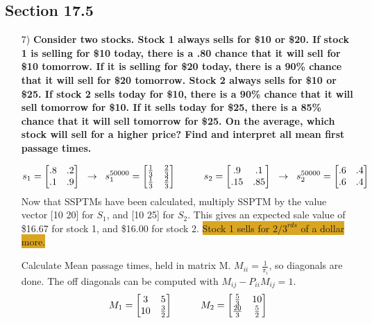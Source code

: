 \documentclass{article}
\begin{document}
\subsection*{Section 17.5}
\begin{enumerate}
\item[7) ] \textbf{Consider two stocks. Stock 1 always sells for \$10 or \$20. If stock 1 is selling for \$10 today, there is a .80 chance that it will sell for \$10 tomorrow. If it is selling for \$20 today, there is a 90\% chance that it will sell for \$20 tomorrow. Stock 2 always sells for \$10 or \$25. If stock 2 sells today for \$10, there is a 90\% chance that it will sell tomorrow for
\$10. If it sells today for \$25, there is a 85\% chance that it will sell tomorrow for \$25. On the average, which stock will sell for a higher price? Find and interpret all mean first passage times.}

\[
s_1 = 
\begin{bmatrix}
.8 & .2\\
.1 & .9 
\end{bmatrix}\hspace*{2mm}\rightarrow\hspace*{2mm}
s_1^{50000} = 
\begin{bmatrix}
\frac{1}{3} & \frac{2}{3}\\
\frac{1}{3} & \frac{2}{3} 
\end{bmatrix}\hspace*{1cm}
s_2 = 
\begin{bmatrix}
.9 & .1\\
.15 & .85 
\end{bmatrix}\hspace*{2mm}\rightarrow\hspace*{2mm}
s_2^{50000} = 
\begin{bmatrix}
.6 & .4\\
.6 & .4
\end{bmatrix}
\]
Now that SSPTMs have been calculated, multiply SSPTM by the value vector [10 20] for $S_1$, and [10 25] for $S_2$. This gives an expected sale value of \$16.67 for stock 1, and \$16.00 for stock 2. \colorbox{Goldenrod}{Stock 1 sells for $2/3^{rds}$ of a dollar more. }

Calculate Mean passage times, held in matrix M. $M_{ii} = \frac{1}{\pi_i}$, so diagonals are done. The off diagonals can be computed with $M_{ij} - P_{ii}M_{ij} = 1$. 
\[
M_1 = 
\begin{bmatrix}
3 & 5\\
10 & \frac{3}{2} 
\end{bmatrix}\hspace*{1cm}
M_2 = 
\begin{bmatrix}
\frac{5}{3} & 10\\
\frac{20}{3} & \frac{5}{2}
\end{bmatrix}
\]


\end{enumerate}
\end{document}
